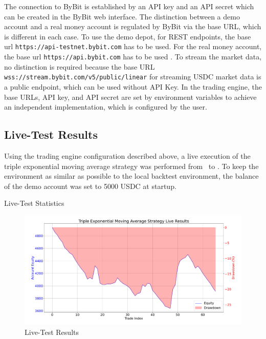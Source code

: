 \noindent
The connection to ByBit is established by an API key and an API secret which can be created in the ByBit web interface.
The distinction between a demo account and a real money account is regulated by ByBit via the base URL, which is different in each case.
To use the demo depot, for REST endpoints, the base url \texttt{https://api-testnet.bybit.com} has to be used.
For the real money account, the base url \texttt{https://api.bybit.com} has to be used \cite{integration}.
To stream the market data, no distinction is required because the base URL \texttt{wss://stream.bybit.com/v5/public/linear} \cite{ws-connect} for streaming USDC market data is a public endpoint, which can be used without API Key.
In the trading engine, the base URLs, API key, and API secret are set by environment variables to achieve an independent implementation, which is configured by the user.

\subsection{Live-Test Results}

Using the trading engine configuration described above, a live execution of the triple exponential moving average strategy was performed from \liveStartDataStartDate~to \liveStartDataEndDate.
To keep the environment as similar as possible to the local backtest environment, the balance of the demo account was set to 5000 USDC at startup.

\begin{table}
    \centering
    
    \caption{Live-Test Statistics}
    \label{tbl:live-results}
\end{table}

\begin{figure}[H]
    \centering
    \includegraphics[width=\textwidth]{images/live/live-result}
    \caption{Live-Test Results}
    \label{fig:live-results}
\end{figure}

